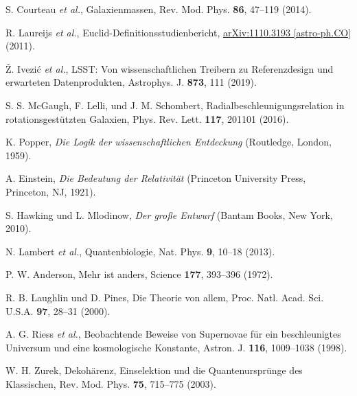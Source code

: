 \documentclass[twocolumn,aps,prl]{revtex4-2}
\begin{document}
{{{{{{{{{{{{{{{{\begin{thebibliography}{99}
																				 S. Courteau \textit{et al.}, Galaxienmassen, Rev. Mod. Phys. \textbf{86}, 47--119 (2014).
																				
																				 R. Laureijs \textit{et al.}, Euclid-Definitionsstudienbericht, \href{https://arxiv.org/abs/1110.3193}{arXiv:1110.3193 [astro-ph.CO]} (2011).
																				
																				 Ž. Ivezić \textit{et al.}, LSST: Von wissenschaftlichen Treibern zu Referenzdesign und erwarteten Datenprodukten, Astrophys. J. \textbf{873}, 111 (2019).
																				
																				 S. S. McGaugh, F. Lelli, und J. M. Schombert, Radialbeschleunigungsrelation in rotationsgestützten Galaxien, Phys. Rev. Lett. \textbf{117}, 201101 (2016).
																				
																				 K. Popper, \textit{Die Logik der wissenschaftlichen Entdeckung} (Routledge, London, 1959).
																				
																				 A. Einstein, \textit{Die Bedeutung der Relativität} (Princeton University Press, Princeton, NJ, 1921).
																				
																				 S. Hawking und L. Mlodinow, \textit{Der große Entwurf} (Bantam Books, New York, 2010).
																				
																				 N. Lambert \textit{et al.}, Quantenbiologie, Nat. Phys. \textbf{9}, 10--18 (2013).
																				
																				 P. W. Anderson, Mehr ist anders, Science \textbf{177}, 393--396 (1972).
																				
																				 R. B. Laughlin und D. Pines, Die Theorie von allem, Proc. Natl. Acad. Sci. U.S.A. \textbf{97}, 28--31 (2000).
																				
																				 A. G. Riess \textit{et al.}, Beobachtende Beweise von Supernovae für ein beschleunigtes Universum und eine kosmologische Konstante, Astron. J. \textbf{116}, 1009--1038 (1998).
																				
																				 W. H. Zurek, Dekohärenz, Einselektion und die Quantenursprünge des Klassischen, Rev. Mod. Phys. \textbf{75}, 715--775 (2003).
																				

\end{thebibliography}}}}}}}}}}}}}}}}}
\end{document}
